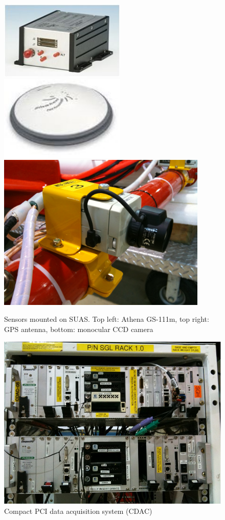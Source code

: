 \begin{figure}[h]
  \centering
  \includegraphics[width=6cm,keepaspectratio=true]{./Figures/athena.jpg}
  \includegraphics[width=6cm,keepaspectratio=true]{./Figures/GPS_antenna.jpg}
  \includegraphics[width=10cm,keepaspectratio=true]{./Figures/wide_cam.jpg}
  \caption{Sensors mounted on SUAS. Top left: Athena
  GS-111m, top right: GPS antenna, bottom: monocular CCD camera}
  \label{fig:SUAS_sensors}
\end{figure}

\begin{figure}[h]
  \centering
  \includegraphics[width=12cm,keepaspectratio=true]{./Figures/CDAC_Rack.jpg}
  \caption{Compact PCI data acquisition system (CDAC)}
  \label{fig:CDAC}
\end{figure}


